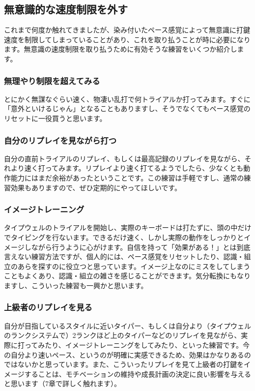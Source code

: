\subsection{無意識的な速度制限を外す}

これまで何度か触れてきましたが、染み付いたペース感覚によって無意識に打鍵速度を制限してしまっていることがあり、これを取り払うことが時に必要になります。無意識の速度制限を取り払うために有効そうな練習をいくつか紹介します。

\subsubsection*{無理やり制限を超えてみる}

とにかく無謀なぐらい速く、物凄い乱打で何トライアルか打ってみます。すぐに「意外といけるじゃん」となることもありますし、そうでなくてもペース感覚のリセットに一役買うと思います。

\subsubsection*{自分のリプレイを見ながら打つ}

自分の直前トライアルのリプレイ、もしくは最高記録のリプレイを見ながら、それより速く打ってみます。リプレイより速く打てるようでしたら、少なくとも動作能力にはまだ余裕があったということです。この練習は手軽ですし、通常の練習効果もありますので、ぜひ定期的にやってほしいです。

\subsubsection*{イメージトレーニング}

タイプウェルのトライアルを開始し、実際のキーボードは打たずに、頭の中だけでタイピングを行ないます。できるだけ速く、しかし実際の動作をしっかりとイメージしながら行うように心がけます。自信を持って「効果がある！」とは到底言えない練習方法ですが、個人的には、ペース感覚をリセットしたり、認識・組立のあらを探すのに役立つと思っています。イメージ上なのにミスをしてしまうこともよくあり、認識・組立の雑さを感じることができます。気分転換にもなりますし、こういった練習も一興かと思います。

\subsubsection*{上級者のリプレイを見る}

自分が目指しているスタイルに近いタイパー、もしくは自分より（タイプウェルのランクシステムで）2ランクほど上のタイパーなどのリプレイを見ながら、実際に打ってみたり、イメージトレーニングをしてみたり、といった練習です。今の自分より速いペース、というのが明確に実感できるため、効果はかなりあるのではないかと思っています。また、こういったリプレイを見て上級者の打鍵をイメージすることは、モチベーションの維持や成長計画の決定に良い影響を与えると思います（7章で詳しく触れます）。

